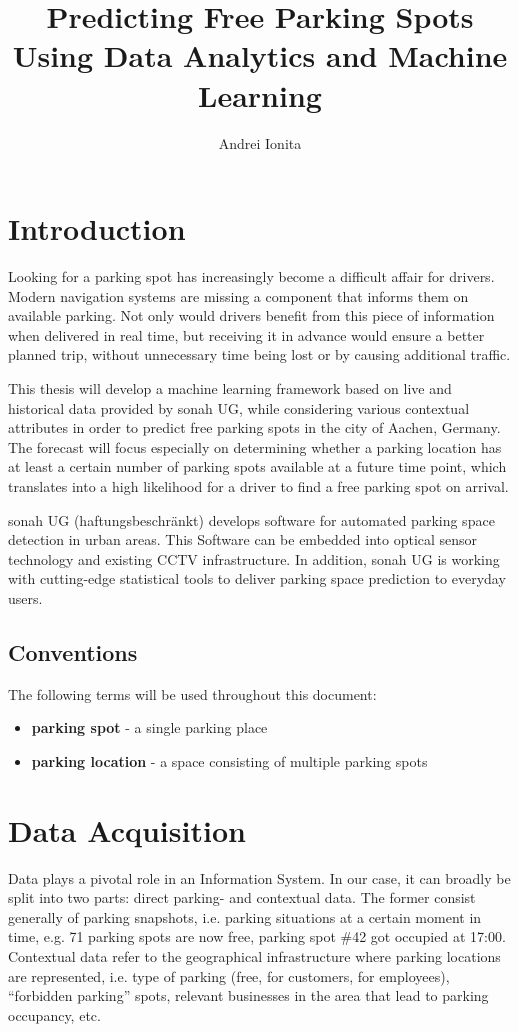 \documentclass{article}
\begin{document}
\title{Predicting Free Parking Spots Using Data Analytics and Machine Learning}
\author{Andrei Ionita}

\maketitle

\section{Introduction}
Looking for a parking spot has increasingly become a difficult affair for drivers. Modern navigation systems are missing a component that informs them on available parking. Not only would drivers benefit from this piece of information when delivered in real time, but receiving it in advance would ensure a better planned trip, without unnecessary time being lost or by causing additional traffic.

\vspace{2mm}
This thesis will develop a machine learning framework based on live and historical data provided by sonah UG, while considering various contextual attributes in order to predict free parking spots in the city of Aachen, Germany. The forecast will focus especially on determining whether a parking location has at least a certain number of parking spots available at a future time point, which translates into a high likelihood for a driver to find a free parking spot on arrival.

\vspace{2mm}
sonah UG (haftungsbeschr\"ankt) develops software for automated parking space detection in urban areas. This Software can be embedded into optical sensor technology and existing CCTV infrastructure. In addition, sonah UG is working with cutting-edge statistical tools to deliver parking space prediction to everyday users. 

\subsection{Conventions}
The following terms will be used throughout this document:
\begin{itemize}
\item \textbf{parking spot} - a single parking place
\item \textbf{parking location} - a space consisting of multiple parking spots
\end{itemize}

\section{Data Acquisition}
Data plays a pivotal role in an Information System. In our case, it can broadly be split into two parts: direct parking- and contextual data. The former consist generally of parking snapshots, i.e. parking situations at a certain moment in time, e.g. 71 parking spots are now free, parking spot \#42 got occupied at 17:00. Contextual data refer to the geographical infrastructure where parking locations are represented, i.e. type of parking (free, for customers, for employees), ``forbidden parking'' spots, relevant businesses in the area that lead to parking occupancy, etc.
\end{document}
